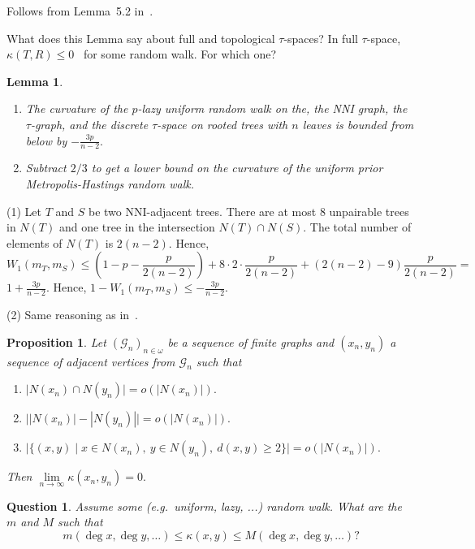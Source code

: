 \documentclass{amsart}
\newtheorem{lemma}{Lemma}
\newtheorem{question}{Question}
\newtheorem{proposition}{Proposition}
\begin{document}
\proof
Follows from Lemma~5.2 in~\cite{Whidden2015-es}. 
\endproof

What does this Lemma say about full and topological $\tau$-spaces? 
In full $\tau$-space, $\kappa(T,R) \leq 0$~\cite{Gavryushkin2014-bw} for some random walk. 
For which one? 

\begin{lemma}
\begin{enumerate}
\item The curvature of the $p$-lazy uniform random walk on the, the NNI
graph, the $\tau$-graph, and the discrete $\tau$-space on rooted trees with 
$n$ leaves is bounded from below by $-\displaystyle\frac{3p}{n-2}.$
\item Subtract $2/3$ to get a lower bound on the curvature of the
uniform prior Metropolis-Hastings random walk.
\end{enumerate}
\end{lemma}

\proof
(1) Let $T$ and $S$ be two NNI-adjacent trees. There are at most $8$ unpairable 
trees in $N(T)$ and one tree in the intersection $N(T) \cap N(S)$. The
total number of elements of $N(T)$ is $2(n-2).$
Hence, 
\[
W_1(m_T,m_S)\leq (1 - p - \frac{p}{2(n - 2)}) + 
8 \cdot 2 \cdot \frac{p}{2(n - 2)} +
(2(n - 2) - 9)\frac{p}{2(n-2)} =
\]
$1 + \displaystyle\frac{3p}{n-2}.$ 
Hence, $1 - W_1(m_T,m_S) \leq - \displaystyle\frac{3p}{n-2}.$

(2) Same reasoning as in~\cite{Whidden2015-es}. 
\endproof

\begin{proposition}
Let $(\mathcal G_n)_{n \in \omega}$ be a sequence of finite graphs and 
$(x_n, y_n)$ a sequence of adjacent vertices from $\mathcal G_n$ such that
\begin{enumerate}[(1)]
\item $\big|N(x_n) \cap N(y_n)\big| = o(|N(x_n)|).$ 
\item $\big||N(x_n)| - |N(y_n)|\big| = o(|N(x_n)|).$ 
\item $\big|\{(x,y) \mid x \in N(x_n),~ y \in N(y_n),~ d(x, y) \geq 2\}\big| 
= o(|N(x_n)|).$
\end{enumerate}

Then $\lim\limits_{n \to \infty} \kappa(x_n, y_n) = 0.$
\end{proposition}

\proof

\endproof

\begin{question}
Assume some (e.g.\ uniform, lazy, ...) random walk. What are the $m$ and $M$ 
such that 
\[
m(\deg x,\deg y, \ldots) \leq \kappa(x,y) \leq M(\deg x, \deg y, \ldots)? 
\]
\end{question}
\end{document}

